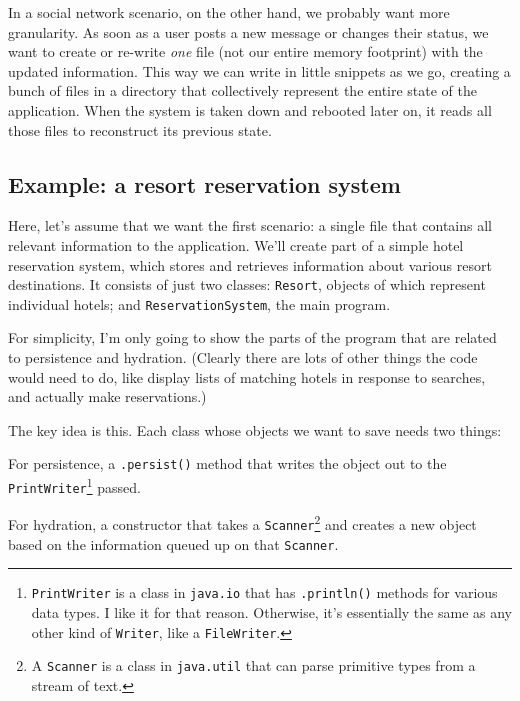 In a social network scenario, on the other hand, we probably want more
granularity. As soon as a user posts a new message or changes their status, we
want to create or re-write \textit{one} file (not our entire memory footprint)
with the updated information. This way we can write in little snippets as we
go, creating a bunch of files in a directory that collectively represent the
entire state of the application. When the system is taken down and rebooted
later on, it reads all those files to reconstruct its previous state.

\subsection{Example: a resort reservation system}
\label{sec:resortExample}

Here, let's assume that we want the first scenario: a single file that
contains all relevant information to the application. We'll create part of a
simple hotel reservation system, which stores and retrieves information about
various resort destinations. It consists of just two classes: \texttt{Resort},
objects of which represent individual hotels; and \texttt{ReservationSystem},
the main program.

For simplicity, I'm only going to show the parts of the program that are
related to persistence and hydration. (Clearly there are lots of other things
the code would need to do, like display lists of matching hotels in response
to searches, and actually make reservations.)

The key idea is this. Each class whose objects we want to save needs two
things:

\begin{compactitem}

\item For persistence, a \texttt{.persist()} method that writes the object out
to the \texttt{PrintWriter}\footnote{\texttt{PrintWriter} is a class in
\texttt{java.io} that has \texttt{.println()} methods for various data types.
I like it for that reason. Otherwise, it's essentially the same as any other
kind of \texttt{Writer}, like a \texttt{FileWriter}.} passed.

\item For hydration, a constructor that takes a \texttt{Scanner}\footnote{A
\texttt{Scanner} is a class in \texttt{java.util} that can parse primitive
types from a stream of text.} and creates a new object based on the
information queued up on that \texttt{Scanner}.

\end{compactitem}

